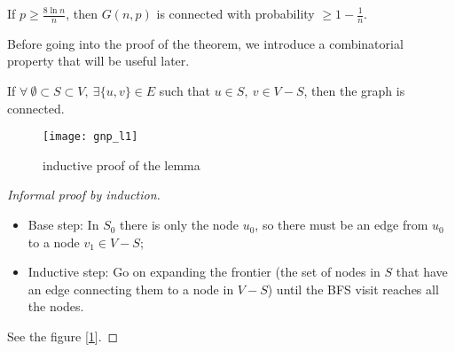     \begin{thm}[Connectivity of G(n,p)]\label{thm:gnp-connectivity}
        If $p \geq \frac{8 \ln n}{n}$, then $G(n,p)$ is connected with probability $\geq 1 - \frac{1}{n}$.
    \end{thm}

    Before going into the proof of the theorem, we introduce a combinatorial property that will be useful later.
    
    \begin{lem}\label{l:gnp-connectivity}
        If $\forall\ \emptyset \subset S \subset V,\ \exists \{u,v\} \in E$ such that $u\in S,\ v \in V-S$, then the graph is connected.
    \end{lem}

    \begin{figure}[h!]
        \centering
        \texttt{[image: gnp\_l1]}
        \caption{inductive proof of the lemma}
        \label{fig:gnp-l1}
    \end{figure}

    \begin{proof}[Informal proof by induction] \
        \begin{itemize}
            \item Base step: In $S_0$ there is only the node $u_0$, so there must be an edge from $u_0$ to a node $v_1 \in V-S$;
            \item Inductive step: Go on expanding the frontier (the set of nodes in $S$ that have an edge connecting them to a node in $V-S$) until the BFS visit reaches all the nodes.
        \end{itemize}
    
        See the figure [\ref{fig:gnp-l1}].
    \end{proof}

